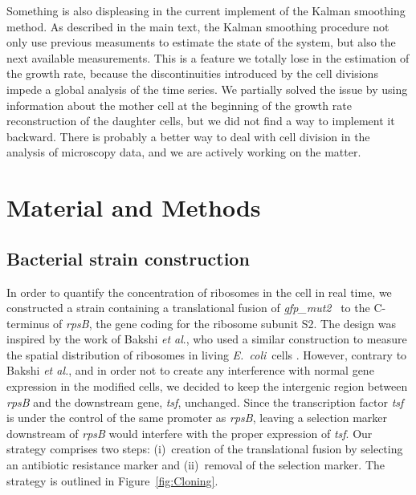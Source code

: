Something is also displeasing in the current implement of the Kalman smoothing method.
As described in the main text, the Kalman smoothing procedure not only use previous measuments to estimate the state of the system, but also the next available measurements.
This is a feature we totally lose in the estimation of the growth rate, because the discontinuities introduced by the cell divisions impede a global analysis of the time series.
We partially solved the issue by using information about the mother cell at the beginning of the growth rate reconstruction of the daughter cells, but we did not find a way to implement it backward.
There is probably a better way to deal with cell division in the analysis of microscopy data, and we are actively working on the matter.

\section{Material and Methods}

\subsection{Bacterial strain construction}

\label{sec:methods_strain}

In order to quantify the concentration of ribosomes in the cell in
real time, we constructed a strain  containing a translational fusion
of \textit{gfp\_mut2}~\cite{zaslaver_comprehensive_2006} to the
C-terminus of \textit{rpsB}, the gene coding for the ribosome subunit
S2. The design was inspired by the work of Bakshi \textit{et al}.,
who used a similar construction to measure the spatial distribution
of ribosomes in living \textit{E.~coli}~cells \cite{bakshi_superresolution_2012}.
However, contrary to Bakshi \textit{et al.}, and in order not to create
any interference with normal gene expression in the modified cells,
we decided to keep the intergenic region between \textit{rpsB} and
the downstream gene, \textit{tsf}, unchanged. Since the transcription
factor \textit{tsf} is under the control of the same promoter as \textit{rpsB},
leaving a selection marker downstream of \textit{rpsB} would interfere
with the proper expression of \textit{tsf}. Our strategy comprises
two steps: (i)~creation of the translational fusion by selecting
an antibiotic resistance marker and (ii)~removal of the selection
marker. The strategy is outlined in Figure~\ref{fig:Cloning}.


